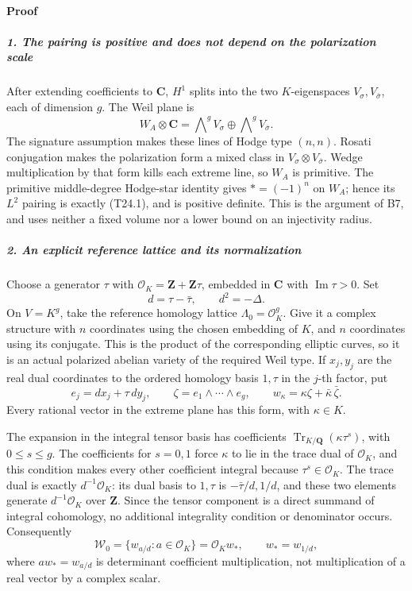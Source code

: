 \documentclass[11pt,a4paper]{article}
\theoremstyle{definition}
\begin{document}
\paragraph{Proof}\label{proof-5}

\subparagraph{1. The pairing is positive and does not depend on the polarization scale}\label{the-pairing-is-positive-and-does-not-depend-on-the-polarization-scale}

After extending coefficients to \(\mathbf C\), \(H^1\) splits into the two \(K\)-eigenspaces \(V_\sigma,V_{\bar\sigma}\), each of dimension \(g\). The Weil plane is \[
 W_A\otimes\mathbf C
     =\bigwedge\nolimits^g V_\sigma
        \oplus \bigwedge\nolimits^g V_{\bar\sigma}.
 \tag{T24.8}
\] The signature assumption makes these lines of Hodge type \((n,n)\). Rosati conjugation makes the polarization form a mixed class in \(V_\sigma\otimes V_{\bar\sigma}\). Wedge multiplication by that form kills each extreme line, so \(W_A\) is primitive. The primitive middle-degree Hodge-star identity gives \(*=(-1)^n\) on \(W_A\); hence its \(L^2\) pairing is exactly (T24.1), and is positive definite. This is the argument of B7, and uses neither a fixed volume nor a lower bound on an injectivity radius.

\subparagraph{2. An explicit reference lattice and its normalization}\label{an-explicit-reference-lattice-and-its-normalization}

Choose a generator \(\tau\) with \(\mathcal O_K=\mathbf Z+\mathbf Z\tau\), embedded in \(\mathbf C\) with \(\operatorname{Im}\tau>0\). Set \[
 d=\tau-\bar\tau,\qquad d^2=-\Delta.
 \tag{T24.9}
\] On \(V=K^g\), take the reference homology lattice \(\Lambda_0=\mathcal O_K^g\). Give it a complex structure with \(n\) coordinates using the chosen embedding of \(K\), and \(n\) coordinates using its conjugate. This is the product of the corresponding elliptic curves, so it is an actual polarized abelian variety of the required Weil type. If \(x_j,y_j\) are the real dual coordinates to the ordered homology basis \(1,\tau\) in the \(j\)-th factor, put \[
 e_j=dx_j+\tau\,dy_j,\qquad
 \zeta=e_1\wedge\cdots\wedge e_g,\qquad
 w_\kappa=\kappa\zeta+\bar\kappa\,\bar\zeta.
 \tag{T24.10}
\] Every rational vector in the extreme plane has this form, with \(\kappa\in K\).

The expansion in the integral tensor basis has coefficients \(\operatorname{Tr}_{K/\mathbf Q}(\kappa\tau^s)\), with \(0\le s\le g\). The coefficients for \(s=0,1\) force \(\kappa\) to lie in the trace dual of \(\mathcal O_K\), and this condition makes every other coefficient integral because \(\tau^s\in\mathcal O_K\). The trace dual is exactly \(d^{-1}\mathcal O_K\): its dual basis to \(1,\tau\) is \(-\bar\tau/d,1/d\), and these two elements generate \(d^{-1}\mathcal O_K\) over \(\mathbf Z\). Since the tensor component is a direct summand of integral cohomology, no additional integrality condition or denominator occurs. Consequently \[
 \mathscr W_0=\{w_{a/d}:a\in\mathcal O_K\}
              =\mathcal O_K w_*,\qquad w_*=w_{1/d},
 \tag{T24.11}
\] where \(a w_*=w_{a/d}\) is determinant coefficient multiplication, not multiplication of a real vector by a complex scalar.
\end{document}
